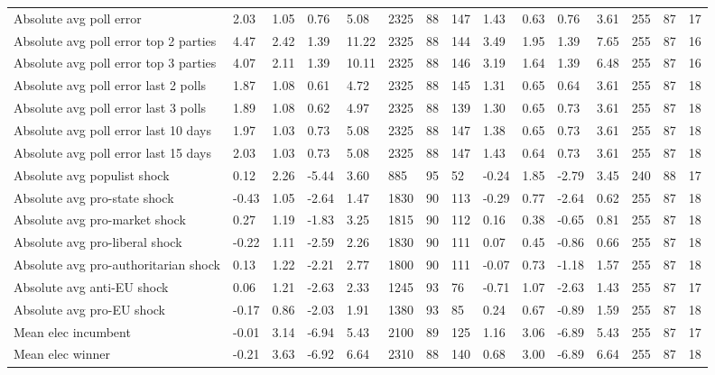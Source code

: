 \begin{longtable}{lllllllllllllll}
Absolute avg poll error & 2.03 & 1.05 & 0.76 & 5.08 & 2325 & 88 & 147 & 1.43 & 0.63 & 0.76 & 3.61 & 255 & 87 & 17\\
Absolute avg poll error top 2 parties & 4.47 & 2.42 & 1.39 & 11.22 & 2325 & 88 & 144 & 3.49 & 1.95 & 1.39 & 7.65 & 255 & 87 & 16\\
Absolute avg poll error top 3 parties & 4.07 & 2.11 & 1.39 & 10.11 & 2325 & 88 & 146 & 3.19 & 1.64 & 1.39 & 6.48 & 255 & 87 & 16\\
Absolute avg poll error last 2 polls & 1.87 & 1.08 & 0.61 & 4.72 & 2325 & 88 & 145 & 1.31 & 0.65 & 0.64 & 3.61 & 255 & 87 & 18\\
\addlinespace
Absolute avg poll error last 3 polls & 1.89 & 1.08 & 0.62 & 4.97 & 2325 & 88 & 139 & 1.30 & 0.65 & 0.73 & 3.61 & 255 & 87 & 18\\
Absolute avg poll error last 10 days & 1.97 & 1.03 & 0.73 & 5.08 & 2325 & 88 & 147 & 1.38 & 0.65 & 0.73 & 3.61 & 255 & 87 & 18\\
Absolute avg poll error last 15 days & 2.03 & 1.03 & 0.73 & 5.08 & 2325 & 88 & 147 & 1.43 & 0.64 & 0.73 & 3.61 & 255 & 87 & 18\\
Absolute avg populist shock & 0.12 & 2.26 & -5.44 & 3.60 & 885 & 95 & 52 & -0.24 & 1.85 & -2.79 & 3.45 & 240 & 88 & 17\\
Absolute avg pro-state shock & -0.43 & 1.05 & -2.64 & 1.47 & 1830 & 90 & 113 & -0.29 & 0.77 & -2.64 & 0.62 & 255 & 87 & 18\\
\addlinespace
Absolute avg pro-market shock & 0.27 & 1.19 & -1.83 & 3.25 & 1815 & 90 & 112 & 0.16 & 0.38 & -0.65 & 0.81 & 255 & 87 & 18\\
Absolute avg pro-liberal shock & -0.22 & 1.11 & -2.59 & 2.26 & 1830 & 90 & 111 & 0.07 & 0.45 & -0.86 & 0.66 & 255 & 87 & 18\\
Absolute avg pro-authoritarian shock & 0.13 & 1.22 & -2.21 & 2.77 & 1800 & 90 & 111 & -0.07 & 0.73 & -1.18 & 1.57 & 255 & 87 & 18\\
Absolute avg anti-EU shock & 0.06 & 1.21 & -2.63 & 2.33 & 1245 & 93 & 76 & -0.71 & 1.07 & -2.63 & 1.43 & 255 & 87 & 17\\
Absolute avg pro-EU shock & -0.17 & 0.86 & -2.03 & 1.91 & 1380 & 93 & 85 & 0.24 & 0.67 & -0.89 & 1.59 & 255 & 87 & 18\\
\addlinespace
Mean elec incumbent & -0.01 & 3.14 & -6.94 & 5.43 & 2100 & 89 & 125 & 1.16 & 3.06 & -6.89 & 5.43 & 255 & 87 & 17\\
Mean elec winner & -0.21 & 3.63 & -6.92 & 6.64 & 2310 & 88 & 140 & 0.68 & 3.00 & -6.89 & 6.64 & 255 & 87 & 18\\

\end{longtable}
